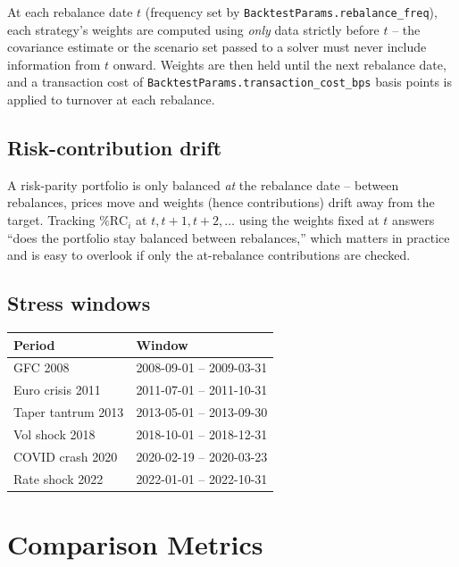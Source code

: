\documentclass[11pt]{article}
\begin{document}
At each rebalance date $t$ (frequency set by
\texttt{BacktestParams.rebalance\_freq}), each strategy's weights are
computed using \emph{only} data strictly before $t$ -- the covariance
estimate or the scenario set passed to a solver must never include
information from $t$ onward. Weights are then held until the next
rebalance date, and a transaction cost of
\texttt{BacktestParams.transaction\_cost\_bps} basis points is applied to
turnover at each rebalance.

\subsection{Risk-contribution drift}

A risk-parity portfolio is only balanced \emph{at} the rebalance date --
between rebalances, prices move and weights (hence contributions) drift
away from the target. Tracking $\%\text{RC}_i$ at $t, t+1, t+2, \dots$
using the weights fixed at $t$ answers ``does the portfolio stay balanced
between rebalances,'' which matters in practice and is easy to overlook
if only the at-rebalance contributions are checked.

\subsection{Stress windows}

\begin{center}
\begin{tabular}{ll}
\toprule
Period & Window \\
\midrule
GFC 2008 & 2008-09-01 -- 2009-03-31 \\
Euro crisis 2011 & 2011-07-01 -- 2011-10-31 \\
Taper tantrum 2013 & 2013-05-01 -- 2013-09-30 \\
Vol shock 2018 & 2018-10-01 -- 2018-12-31 \\
COVID crash 2020 & 2020-02-19 -- 2020-03-23 \\
Rate shock 2022 & 2022-01-01 -- 2022-10-31 \\
\bottomrule
\end{tabular}
\end{center}

\section{Comparison Metrics}
\label{sec:metrics}
\end{document}
